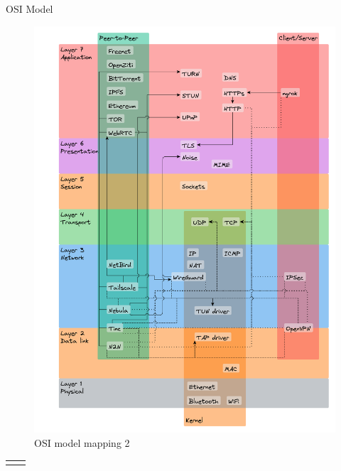 \begin{frame}{OSI Model}
\begin{figure}
\centering
\includegraphics[width=\textwidth,height=0.9\textheight]{notes/../figures/osi-map.yed.png}
\caption{OSI model mapping 2}
\end{figure}

\newpage

\begin{longtable}[]{@{}ll@{}}
\toprule\noalign{}
\endhead
& \\
\bottomrule\noalign{}
\end{longtable}


\end{frame}
